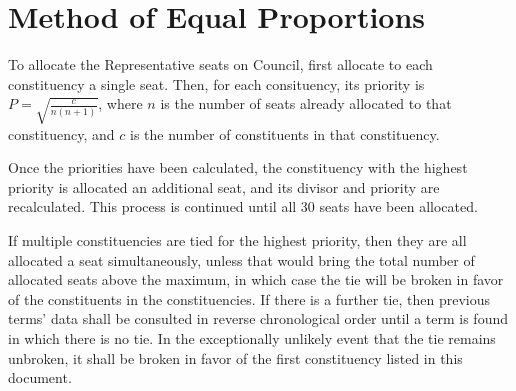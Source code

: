 \section{Method of Equal Proportions}
To allocate the Representative seats on Council, first allocate to each
constituency a single seat. Then, for each consituency, its priority is $P =
\sqrt{\frac{c}{n(n+1)}}$, where $n$ is the number of seats already allocated to
that constituency, and $c$ is the number of constituents in that constituency.

Once the priorities have been calculated, the constituency with the highest
priority is allocated an additional seat, and its divisor and priority are
recalculated. This process is continued until all 30 seats have been allocated.

If multiple constituencies are tied for the highest priority, then they are all
allocated a seat simultaneously, unless that would bring the total number of
allocated seats above the maximum, in which case the tie will be broken in favor
of the constituents in the constituencies. If there is a further tie, then
previous terms' data shall be consulted in reverse chronological order until a
term is found in which there is no tie. In the exceptionally unlikely event that
the tie remains unbroken, it shall be broken in favor of the first constituency
listed in this document.